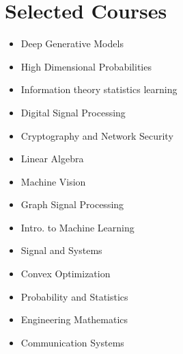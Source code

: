 \documentclass[letterpaper,11pt]{article}
\newcommand{\resumeSubHeadingListStart}{\begin{itemize}[leftmargin=0.15in, label={}]}
\newcommand{\resumeSubHeadingListEnd}{\end{itemize}}
\begin{document}
        \section{Selected Courses}
        \vspace{2pt}
        \resumeSubHeadingListStart
        \begin{multicols}{2}
        \begin{itemize}[label=$\bullet$]
            \item Deep Generative Models
            \item High Dimensional Probabilities
            \item Information theory statistics learning
            \item Digital Signal Processing
            \item Cryptography and Network Security
            \item Linear Algebra
            \item Machine Vision
            \item Graph Signal Processing
            \item Intro. to Machine Learning
            \item Signal and Systems
            \item Convex Optimization
            \item Probability and Statistics
            \item Engineering Mathematics
            \item Communication Systems
        \end{itemize}
        \end{multicols}

        \resumeSubHeadingListEnd
\end{document}
